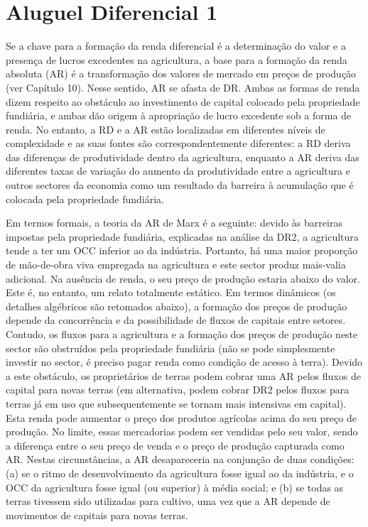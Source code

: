 \section{Aluguel Diferencial 1}
 \par 
Se a chave para a formação da renda diferencial é a determinação do valor e a presença de lucros excedentes na agricultura, a base para a formação da renda absoluta (AR) é a transformação dos valores de mercado em preços de produção (ver Capítulo {\color{blue}10}). Nesse sentido, AR se afasta de DR. Ambas as formas de renda dizem respeito ao obstáculo ao investimento de capital colocado pela propriedade fundiária, e ambas dão origem à apropriação de lucro excedente sob a forma de renda. No entanto, a RD e a AR estão localizadas em diferentes níveis de complexidade e as suas fontes são correspondentemente diferentes: a RD deriva das diferenças de produtividade dentro da agricultura, enquanto a AR deriva das diferentes taxas de variação do aumento da produtividade entre a agricultura e outros sectores da economia como um resultado da barreira à acumulação que é colocada pela propriedade fundiária.
 \par 
Em termos formais, a teoria da AR de Marx é a seguinte: devido às barreiras impostas pela propriedade fundiária, explicadas na análise da DR2, a agricultura tende a ter um OCC inferior ao da indústria. Portanto, há uma maior proporção de mão-de-obra viva empregada na agricultura e este sector produz mais-valia adicional. Na ausência de renda, o seu preço de produção estaria abaixo do valor. Este é, no entanto, um relato totalmente estático. Em termos dinâmicos (os detalhes algébricos são retomados abaixo), a formação dos preços de produção depende da concorrência e da possibilidade de fluxos de capitais entre setores. Contudo, os fluxos para a agricultura e a formação dos preços de produção neste sector são obstruídos pela propriedade fundiária (não se pode simplesmente investir no sector, é preciso pagar renda como condição de acesso à terra). Devido a este obstáculo, os proprietários de terras podem cobrar uma AR pelos fluxos de capital para novas terras (em alternativa, podem cobrar DR2 pelos fluxos para terras já em uso que subsequentemente se tornam mais intensivas em capital). Esta renda pode aumentar o preço dos produtos agrícolas acima do seu preço de produção. No limite, essas mercadorias podem ser vendidas pelo seu valor, sendo a diferença entre o seu preço de venda e o preço de produção capturada como AR. Nestas circunstâncias, a AR desapareceria na conjunção de duas condições: (a) se o ritmo de desenvolvimento da agricultura fosse igual ao da indústria, e o OCC da agricultura fosse igual (ou superior) à média social; e (b) se todas as terras tivessem sido utilizadas para cultivo, uma vez que a AR depende de movimentos de capitais para novas terras.
